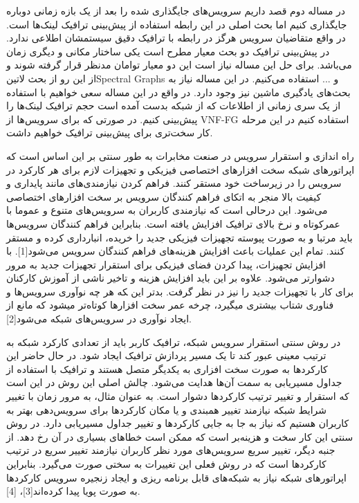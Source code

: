 \documentclass{book}
\begin{document}
در مساله دوم قصد داریم سرویس‌های جایگذاری شده را بعد از یک بازه زمانی دوباره جایگذاری کنیم اما بحث اصلی در این رابطه استفاده از پیش‌بینی ترافیک لینک‌ها است.
در واقع متقاضیان سرویس هرگز در رابطه با ترافیک دقیق سیستمشان اطلاعی ندارد. در پیش‌بینی ترافیک دو بحث معیار مطرح است یکی ساختار مکانی و دیگری زمان می‌باشد.
برای حل این مساله نیاز است این دو معیار توامان مدنظر قرار گرفته شوند و از این رو از بحث ‌لاتین{Spectral Graphs} و ... استفاده می‌کنیم.
در این مساله نیاز به بحث‌های یادگیری ماشین نیز وجود دارد. در واقع در این مساله سعی خواهیم با استفاده از یک سری زمانی از اطلاعات که از شبکه بدست آمده است حجم ترافیک لینک‌ها را پیش‌بینی کنیم.
در صورتی که برای سرویس‌ها از VNF-FG استفاده کنیم در این مرحله کار سخت‌تری برای پیش‌بینی ترافیک خواهیم داشت.


راه اندازی و استقرار سرویس در صنعت مخابرات به طور سنتی بر این اساس است که اپراتورهای شبکه سخت افزارهای اختصاصی فیزیکی
و تجهیزات لازم برای هر کارکرد در سرویس را در زیرساخت خود مستقر کنند.
فراهم کردن نیازمندی‌های مانند پایداری و کیفیت بالا منجر به اتکای فراهم کنندگان سرویس بر سخت افزارهای اختصاصی می‌شود.
این درحالی است که نیازمندی کاربران به سرویس‌های متنوع و عموما با عمرکوتاه و نرخ بالای ترافیک افزایش یافته است.
بنابراین فراهم کنندگان سرویس‌ها باید مرتبا و به صورت پیوسته تجهیزات فیزیکی جدید را خریده، انبارداری کرده و مستقر کنند.
تمام این عملیات باعث افزایش هزینه‌های فراهم کنندگان سرویس می‌شود[1].
با افزایش تجهیزات، پیدا کردن فضای فیزیکی برای استقرار تجهیزات جدید به مرور دشوارتر می‌شود.
علاوه بر این باید افزایش هزینه و تاخیر ناشی از آموزش کارکنان برای کار با تجهیزات جدید را نیز در نظر گرفت.
بدتر این ‍که هر چه نوآوری سرویس‌ها و فناوری شتاب بیشتری می‍گیرد، چرخه عمر سخت افزارها کوتاه‌تر می‍شود که مانع از ایجاد نوآوری در سرویس‌های شبکه می‌شود[2].

در روش سنتی استقرار سرویس شبکه، ترافیک کاربر باید از تعدادی کارکرد شبکه به ترتیب معینی عبور کند تا یک مسیر پردازش ترافیک ایجاد شود.
در حال حاضر این کارکردها به صورت سخت افزاری به یکدیگر متصل هستند و ترافیک با استفاده از جداول مسیریابی به سمت آن‌ها هدایت می‌شود.
چالش اصلی این روش در این است که استقرار و تغییر ترتیب کارکردها دشوار است.
به عنوان مثال، به مرور زمان با تغییر شرایط شبکه نیازمند تغییر همبندی و یا مکان کارکردها برای سرویس‌دهی بهتر به کاربران هستیم که نیاز به جا به جایی کارکردها
و تغییر جداول مسیریابی دارد. در روش سنتی این کار سخت و هزینه‌بر است که ممکن است خطاهای بسیاری در آن رخ دهد.
از جنبه دیگر، تغییر سریع سرویس‌های مورد نظر کاربران نیازمند تغییر سریع در ترتیب کارکردها است که در روش فعلی این تغییرات به سختی صورت می‌گیرد.
بنابراین اپراتورهای شبکه نیاز به شبکه‌های قابل برنامه ریزی و ایجاد زنجیره سرویس کارکردها به صورت پویا پیدا کرده‌اند[3]، [4].
\end{document}

